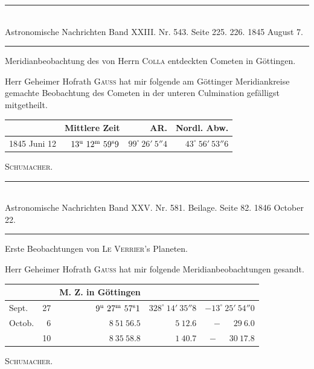 \clearpage
{}
\hypertarget{native-476-middle}{}
\begin{center}
\rule{0.55\linewidth}{0.4pt}\\[2pt]
Astronomische Nachrichten Band XXIII. Nr. 543. Seite 225. 226. 1845 August 7.\\[2pt]
\rule{0.55\linewidth}{0.4pt}
\end{center}

\begin{center}Meridianbeobachtung des von Herrn \textsc{Colla} entdeckten Cometen in Göttingen.\end{center}

Herr Geheimer Hofrath \textsc{Gauss} hat mir folgende am Göttinger Meridiankreise gemachte Beobachtung des Cometen in der unteren Culmination gefälligst mitgetheilt.

\begin{center}
\setlength{\tabcolsep}{5pt}
\begin{tabular}{l|r|r|r}
 & Mittlere Zeit & AR. & Nordl. Abw. \\
\hline
1845 Juni 12 & $13^{\rm u}\ 12^{\rm m}\ 59^{\rm s}9$ & $99^\circ\ 26'\ 5''4$ & $43^\circ\ 56'\ 53''6$ \\
\end{tabular}
\end{center}
\begin{flushright}\textsc{Schumacher}.\end{flushright}

\clearpage
{}
\hypertarget{native-476-planet}{}
\begin{center}
\rule{0.55\linewidth}{0.4pt}\\[2pt]
Astronomische Nachrichten Band XXV. Nr. 581. Beilage. Seite 82. 1846 October 22.\\[2pt]
\rule{0.55\linewidth}{0.4pt}
\end{center}

\begin{center}Erste Beobachtungen von \textsc{Le Verrier}'s Planeten.\end{center}

Herr Geheimer Hofrath \textsc{Gauss} hat mir folgende Meridianbeobachtungen gesandt.

\begin{center}
\setlength{\tabcolsep}{5pt}
\begin{tabular}{lr|r|r|r}
\multicolumn{2}{l|}{} & M. Z. in Göttingen & & \\
\hline
Sept. & 27 & $9^{\rm u}\ 27^{\rm m}\ 57^{\rm s}1$ & $328^\circ\ 14'\ 35''8$ & $-13^\circ\ 25'\ 54''0$ \\
Octob. & 6 & $8\ 51\ 56.5$ & $5\ 12.6$ & $-\phantom{13^\circ\ }29\ 6.0$ \\
 & 10 & $8\ 35\ 58.8$ & $1\ 40.7$ & $-\phantom{13^\circ\ }30\ 17.8$ \\
\end{tabular}
\end{center}
\begin{flushright}\textsc{Schumacher}.\end{flushright}


